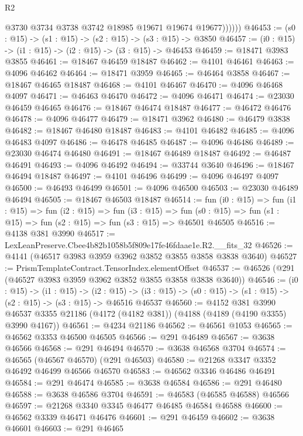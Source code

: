 \begin{lexlean}{R2}
\begin{coremodule}
                @3730
                @3734
                @3738
                @3742
                @18985
                @19671
                @19674
                @19677))))))
@46453 := (s0 : @15) -> (s1 : @15) -> (s2 : @15) -> (s3 : @15) -> @3850
@46457 := (i0 : @15) -> (i1 : @15) -> (i2 : @15) -> (i3 : @15) -> @46453
@46459 := @18471 @3983 @3855
@46461 := @18467 @46459 @18487
@46462 := @4101 @46461
@46463 := @4096 @46462
@46464 := @18471 @3959
@46465 := @46464 @3858
@46467 := @18467 @46465 @18487
@46468 := @4101 @46467
@46470 := @4096 @46468 @4097
@46471 := @46463 @46470
@46472 := @4096 @46471
@46474 := @23030 @46459 @46465
@46476 := @18467 @46474 @18487
@46477 := @46472 @46476
@46478 := @4096 @46477
@46479 := @18471 @3962
@46480 := @46479 @3838
@46482 := @18467 @46480 @18487
@46483 := @4101 @46482
@46485 := @4096 @46483 @4097
@46486 := @46478 @46485
@46487 := @4096 @46486
@46489 := @23030 @46474 @46480
@46491 := @18467 @46489 @18487
@46492 := @46487 @46491
@46493 := @4096 @46492
@46494 := @33744 @3640
@46496 := @18467 @46494 @18487
@46497 := @4101 @46496
@46499 := @4096 @46497 @4097
@46500 := @46493 @46499
@46501 := @4096 @46500
@46503 := @23030 @46489 @46494
@46505 := @18467 @46503 @18487
@46514 := fun (i0 : @15) =>
  fun (i1 : @15) =>
  fun (i2 : @15) =>
  fun (i3 : @15) =>
  fun (s0 : @15) => fun (s1 : @15) => fun (s2 : @15) => fun (s3 : @15) => @46501 @46505
@46516 := @4138 @381 @3990
@46517 := LexLeanPreserve.Cbee4b82b1058b5f809e17fe46fdaae1e.R2.__fits_32
@46526 := @4141 (@46517 @3983 @3959 @3962 @3852 @3855 @3858 @3838 @3640)
@46527 := PrismTemplateContract.TensorIndex.elementOffset
@46537 := @46526 (@291 (@46527 @3983 @3959 @3962 @3852 @3855 @3858 @3838 @3640))
@46546 := (i0 : @15) ->
  (i1 : @15) ->
  (i2 : @15) -> (i3 : @15) -> (s0 : @15) -> (s1 : @15) -> (s2 : @15) -> (s3 : @15) -> @46516 @46537
@46560 := @4152
    @381
    @3990
    @46537
    @3355
    @21186
    (@4172 (@4182 @381))
    (@4188 (@4189 (@4190 @3355) @3990 @4167))
@46561 := @4234 @21186
@46562 := @46561 @1053
@46565 := @46562 @3353 @46500 @46505
@46566 := @291 @46489
@46567 := @3638 @46566
@46568 := @291 @46494
@46570 := @3638 @46568 @3704
@46574 := @46565 (@46567 @46570) (@291 @46503)
@46580 := @21268 @3347 @3352 @46492 @46499 @46566 @46570
@46583 := @46562 @3346 @46486 @46491
@46584 := @291 @46474
@46585 := @3638 @46584
@46586 := @291 @46480
@46588 := @3638 @46586 @3704
@46591 := @46583 (@46585 @46588) @46566
@46597 := @21268 @3340 @3345 @46477 @46485 @46584 @46588
@46600 := @46562 @3339 @46471 @46476
@46601 := @291 @46459
@46602 := @3638 @46601
@46603 := @291 @46465

\end{coremodule}
\end{lexlean}
